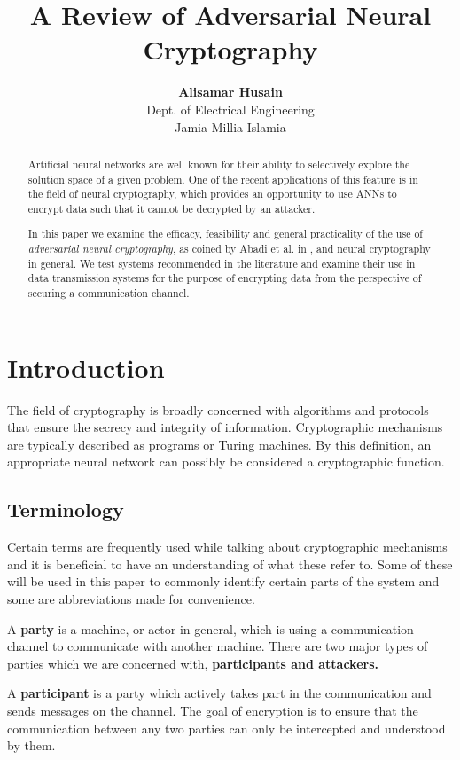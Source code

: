 \documentclass{article}
\title{A Review of Adversarial Neural Cryptography}
\author{
  {\bf Alisamar Husain}\\
  Dept. of Electrical Engineering\\
  Jamia Millia Islamia
}
\begin{document}
  \maketitle

  \begin{abstract}
    Artificial neural networks are well known for their ability to selectively 
    explore the solution space of a given problem.
    One of the recent applications of this feature is in the field of neural 
    cryptography, which provides an opportunity to use ANNs to encrypt data 
    such that it cannot be decrypted by an attacker.

    In this paper we examine the efficacy, feasibility and 
    general practicality of the use of {\it adversarial neural cryptography}, 
    as coined by Abadi et al. in \cite{seminalanc}, and neural cryptography
    in general. We test systems recommended in the literature and examine their 
    use in data transmission systems for the purpose of encrypting data from
    the perspective of securing a communication channel.
  \end{abstract}
 
  \section{Introduction}
  The field of cryptography is broadly concerned with algorithms and protocols 
  that ensure the secrecy and integrity of information. Cryptographic mechanisms are 
  typically described as programs or Turing machines. By this definition, an
  appropriate neural network can possibly be considered a cryptographic function.

    \subsection{Terminology}
    Certain terms are frequently used while talking about cryptographic mechanisms
    and it is beneficial to have an understanding of what these refer to. Some
    of these will be used in this paper to commonly identify certain parts of the 
    system and some are abbreviations made for convenience.

    A {\bf party} is a machine, or actor in general, which is using a communication
    channel to communicate with another machine. There are two major types of parties
    which we are concerned with, {\bf participants and attackers.}
    
    A {\bf participant} is a party which actively takes part in the communication and
    sends messages on the channel. The goal of encryption is to ensure that the 
    communication between any two parties can only be intercepted and understood 
    by them.
\end{document}
